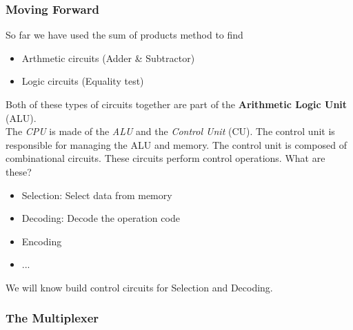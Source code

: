 \documentclass[]{article}
\begin{document}
\begin{center}
\end{center}\bigbreak


\subsubsection{Moving Forward}
\bigbreak

So far we have used the sum of products method to find

\begin{itemize}
	\item Arthmetic circuits (Adder \& Subtractor)
	\item Logic circuits (Equality test)
\end{itemize}\bigbreak

Both of these types of circuits together are part of the \textbf{Arithmetic Logic Unit} (ALU).\\

The \textit{CPU} is made of the \textit{ALU} and the \textit{Control Unit} (CU). The control unit is responsible for managing the ALU and memory. The control unit is composed of combinational circuits. These circuits perform control operations. What are these?

\begin{itemize}
	\item Selection: Select data from memory
	\item Decoding: Decode the operation code
	\item Encoding
	\item ...
\end{itemize}\bigbreak

We will know build control circuits for Selection and Decoding.\\


\subsubsection{The Multiplexer}
\bigbreak
\end{document}

